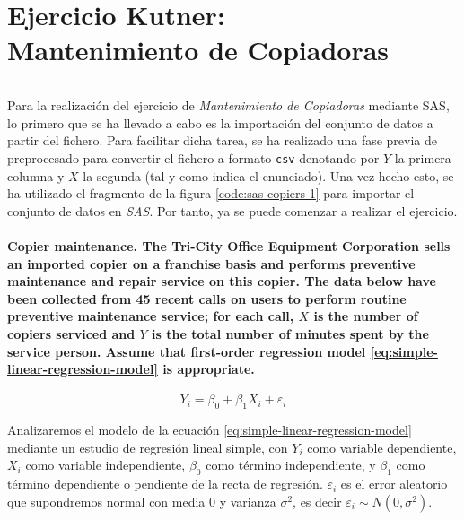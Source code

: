 \documentclass{article}
\begin{document}
  \maketitle


  \part{Ejercicio Kutner:\\ Mantenimiento de Copiadoras}

    \paragraph{}
    Para la realización del ejercicio de \emph{Mantenimiento de Copiadoras} mediante SAS, lo primero que se ha llevado a cabo es la importación del conjunto de datos a partir del fichero. Para facilitar dicha tarea, se ha realizado una fase previa de preprocesado para convertir el fichero a formato \texttt{csv} denotando por $Y$ la primera columna y $X$ la segunda (tal y como indica el enunciado). Una vez hecho esto, se ha utilizado el fragmento de la figura \ref{code:sas-copiers-1} para importar el conjunto de datos en \emph{SAS}. Por tanto, ya se puede comenzar a realizar el ejercicio.

    \setcounter{section}{1}
    \setcounter{subsection}{19}
    \subsection{\textbf{Copier maintenance}. The Tri-City Office Equipment Corporation sells an imported copier on a franchise basis and performs preventive maintenance and repair service on this copier. The data below have been collected from 45 recent calls on users to perform routine preventive maintenance service; for each call, $X$ is the number of copiers serviced and $Y$ is the total number of minutes spent by the service person. Assume that first-order regression model \eqref{eq:simple-linear-regression-model} is appropriate.}
    \label{sec:e1-20}

      \begin{equation}
      \label{eq:simple-linear-regression-model}
        Y_i = \beta_0 + \beta_1X_i + \varepsilon_i
      \end{equation}

      Analizaremos el modelo de la ecuación \ref{eq:simple-linear-regression-model} mediante un estudio de regresión lineal simple, con $Y_i$ como variable dependiente, $X_i$ como variable independiente, $\beta_0$ como término independiente, y $\beta_1$ como término dependiente o pendiente de la recta de regresión. $\varepsilon_i$ es el error aleatorio que supondremos normal con media $0$ y varianza $\sigma^2$, es decir $\varepsilon_i \sim N(0, \sigma^2)$.
\end{document}
